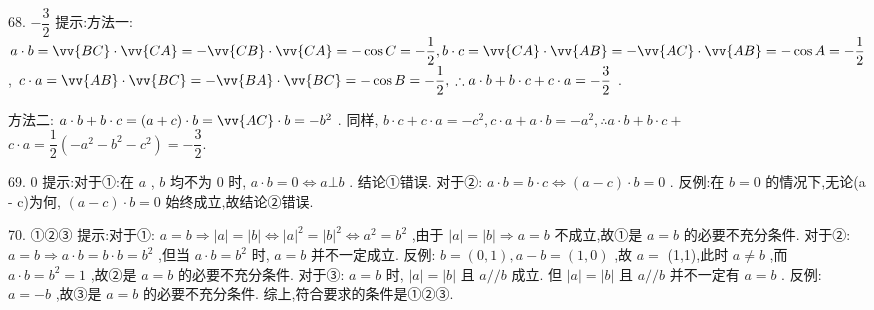 68. $- \dfrac{3}{2}$ 提示:方法一: $a \cdot  b = \vv{BC} \cdot  \vv{CA} =  - \vv{CB} \cdot  \vv{CA} =  - \cos C =  - \dfrac{1}{2},b \cdot  c = \vv{CA} \cdot  \vv{AB} =  - \vv{AC} \cdot  \vv{AB} =  - \cos A =  - \dfrac{1}{2}$ , $c \cdot  a = \vv{AB} \cdot  \vv{BC} =  - \vv{BA} \cdot  \vv{BC} =  - \cos B =  - \dfrac{1}{2},\;\therefore a \cdot  b + b \cdot  c + c \cdot  a =  - \dfrac{3}{2}$ .

方法二: $a \cdot  b + b \cdot  c = \left( {a + c}\right)  \cdot  b = \vv{AC} \cdot  b =  - {b}^{2}$ . 同样, $b \cdot  c + c \cdot  a =  - {c}^{2},c \cdot  a + a \cdot  b =  - {a}^{2},\therefore a \cdot  b + b \cdot  c +$  $c \cdot  a = \dfrac{1}{2}\left( {-{a}^{2} - {b}^{2} - {c}^{2}}\right)  =  - \dfrac{3}{2}.$

69. 0 提示:对于①:在 $a$ , $b$ 均不为 0 时, $a \cdot  b = 0 \Leftrightarrow  a\bot b$ . 结论①错误. 对于②: $a \cdot  b = b \cdot  c \Leftrightarrow  \left( {a - c}\right)  \cdot  b = 0$ . 反例:在 $b = 0$ 的情况下,无论(a - c)为何, $\left( {a - c}\right)  \cdot  b = 0$ 始终成立,故结论②错误.

70. ①②③ 提示:对于①: $a = b \Rightarrow  \left| a\right|  = \left| b\right|  \Leftrightarrow  {\left| a\right| }^{2} = {\left| b\right| }^{2} \Leftrightarrow  {a}^{2} = {b}^{2}$ ,由于 $\left| a\right|  = \left| b\right|  \Rightarrow  a = b$ 不成立,故①是 $a = b$ 的必要不充分条件. 对于②: $a = b \Rightarrow  a \cdot  b = b \cdot  b = {b}^{2}$ ,但当 $a \cdot  b = {b}^{2}$ 时, $a = b$ 并不一定成立. 反例: $b = \left( {0,1}\right) ,a - b = \left( {1,0}\right)$ ,故 $a =$ (1,1),此时 $a \neq  b$ ,而 $a \cdot  b = {b}^{2} = 1$ ,故②是 $a = b$ 的必要不充分条件. 对于③: $a = b$ 时, $\left| a\right|  = \left| b\right|$ 且 $a//b$ 成立. 但 $\left| a\right|  = \left| b\right|$ 且 $a//b$ 并不一定有 $a = b$ . 反例: $a =  - b$ ,故③是 $a = b$ 的必要不充分条件. 综上,符合要求的条件是①②③.


